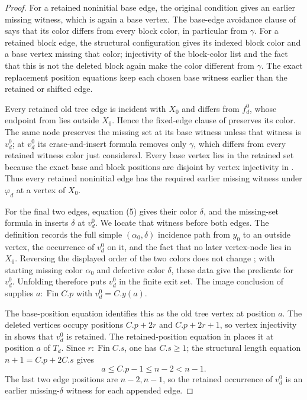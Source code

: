 \begin{proof}
For a retained noninitial base edge, the original
 condition gives an earlier missing witness, which
is again a base vertex.  The base-edge avoidance clause of
 says that its color differs from
every block color, in particular from $\gamma$.  For a retained block
edge, the structural configuration gives its indexed block color and a
base vertex missing that color; injectivity of the block-color list and
the fact that this is not the deleted block again make the color different
from $\gamma$.  The exact replacement position equations keep each chosen
base witness earlier than the retained or shifted edge.

Every retained old tree edge is incident with $X_0$ and differs from
$f^0_d$, whose endpoint from  lies outside
$X_0$.  Hence the fixed-edge clause of
 preserves its color.  The same
node preserves the missing set at its base witness unless that witness is
$v^0_d$; at $v^0_d$ its erase-and-insert formula removes only $\gamma$,
which differs from every retained witness color just considered.  Every
base vertex lies in the retained set because the exact base and block
positions are disjoint by vertex injectivity in .
Thus every retained noninitial edge has the required earlier missing
witness under $\varphi_d$ at a vertex of $X_0$.

For the final two edges, equation (5) gives their color $\delta$, and the
missing-set formula in  inserts
$\delta$ at $v^0_d$.  We locate that witness before both edges.  The
definition  records the full simple
$(\alpha_0,\delta)$ incidence path from $y_0$ to an outside vertex, the
occurrence of $v^0_d$ on it, and the fact that no later vertex-node lies
in $X_0$.  Reversing the displayed order of the two colors does not change
; with starting missing color $\alpha_0$
and defective color $\delta$, these data give the predicate
 for $v^0_d$.  Unfolding
 therefore puts $v^0_d$ in the finite exit
set.  The image conclusion of 
supplies $a:\operatorname{Fin}C.p$ with $v^0_d=C.y(a)$.

The base-position equation identifies this as the old tree vertex at
position $a$.  The deleted vertices occupy positions $C.p+2r$ and
$C.p+2r+1$, so vertex injectivity in  shows that
$v^0_d$ is retained.  The retained-position equation in
 places it at position $a$ of $T_d$.
Since $r:\operatorname{Fin}C.s$, one has $C.s\ge1$; the structural length
equation $n+1=C.p+2C.s$ gives
\[
 a\le C.p-1\le n-2<n-1.
\]
The last two edge positions are $n-2,n-1$, so the retained occurrence of
$v^0_d$ is an earlier missing-$\delta$ witness for each appended edge.


\end{proof}
